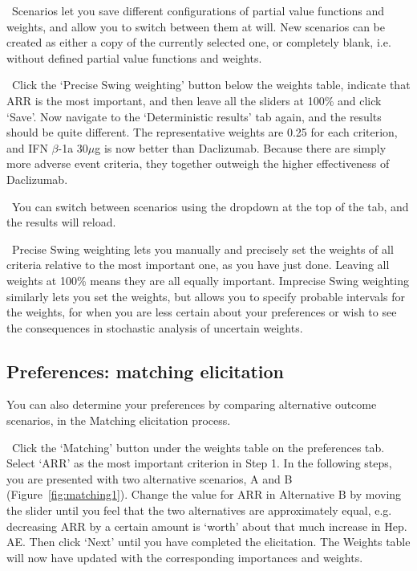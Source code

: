 \documentclass[00_mcda_tutorial.tex]{subfiles}
\begin{document}
\noindent \faGraduationCap \, Scenarios let you save different configurations of partial value functions and weights, and allow you to switch between them at will. New scenarios can be created as either a copy of the currently selected one, or completely blank, i.e. without defined partial value functions  and weights.
\newline

\noindent \leftpointright \, Click the ‘Precise Swing weighting’ button below the weights table, indicate that ARR is the most important, and then leave all the sliders at 100\% and click ‘Save’. Now navigate to the ‘Deterministic results’ tab again, and the results should be quite different. The representative weights are 0.25 for each criterion, and IFN $\beta$-1a 30$\mu$g is now better than Daclizumab. Because there are simply more adverse event criteria, they together outweigh the higher effectiveness of Daclizumab.
\newline

\noindent \faLightbulbO \, You can switch between scenarios using the dropdown at the top of the tab, and the results will reload.
\newline

\noindent \faGraduationCap \, Precise Swing weighting lets you manually and precisely set the weights of all criteria relative to the most important one, as you have just done. Leaving all weights at 100\% means they are all equally important. Imprecise Swing weighting similarly lets you set the weights, but allows you to specify probable intervals for the weights, for when you are less certain about your preferences or wish to see the consequences in stochastic analysis of uncertain weights.

\subsection*{Preferences: matching elicitation}
You can also determine your preferences by comparing alternative outcome scenarios, in the Matching elicitation process.
\newline

\noindent \leftpointright \, Click the ‘Matching’ button under the weights table on the preferences tab. Select ‘ARR’ as the most important criterion in Step 1. In the following steps, you are presented with two alternative scenarios, A and B (Figure~\ref{fig:matching1}). Change the value for ARR in Alternative B by moving the slider until you feel that the two alternatives are approximately equal, e.g. decreasing ARR by a certain amount is ‘worth’ about that much increase in Hep. AE. Then click ‘Next’ until you have completed the elicitation. The Weights table will now have updated with the corresponding importances and weights.
\newline
\end{document}
